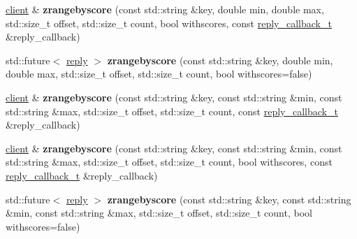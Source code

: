 \begin{DoxyCompactItemize}
\item 
\mbox{\label{classcpp__redis_1_1client_a4f5e81543f8138f897c10fbe17e56804}} 
\hyperlink{classcpp__redis_1_1client}{client} \& {\bfseries zrangebyscore} (const std\+::string \&key, double min, double max, std\+::size\+\_\+t offset, std\+::size\+\_\+t count, bool withscores, const \hyperlink{classcpp__redis_1_1client_a061a1140d36d2eaeda82b09a0bb3f9f2}{reply\+\_\+callback\+\_\+t} \&reply\+\_\+callback)
\item 
\mbox{\label{classcpp__redis_1_1client_af9d54a3c81954e838e31d1c2dd84bf39}} 
std\+::future$<$ \hyperlink{classcpp__redis_1_1reply}{reply} $>$ {\bfseries zrangebyscore} (const std\+::string \&key, double min, double max, std\+::size\+\_\+t offset, std\+::size\+\_\+t count, bool withscores=false)
\item 
\mbox{\label{classcpp__redis_1_1client_adfcaa1035607cde9679783d0b9f4c72b}} 
\hyperlink{classcpp__redis_1_1client}{client} \& {\bfseries zrangebyscore} (const std\+::string \&key, const std\+::string \&min, const std\+::string \&max, std\+::size\+\_\+t offset, std\+::size\+\_\+t count, const \hyperlink{classcpp__redis_1_1client_a061a1140d36d2eaeda82b09a0bb3f9f2}{reply\+\_\+callback\+\_\+t} \&reply\+\_\+callback)
\item 
\mbox{\label{classcpp__redis_1_1client_abbe9cc5870e5a0bd692ac08f36beea91}} 
\hyperlink{classcpp__redis_1_1client}{client} \& {\bfseries zrangebyscore} (const std\+::string \&key, const std\+::string \&min, const std\+::string \&max, std\+::size\+\_\+t offset, std\+::size\+\_\+t count, bool withscores, const \hyperlink{classcpp__redis_1_1client_a061a1140d36d2eaeda82b09a0bb3f9f2}{reply\+\_\+callback\+\_\+t} \&reply\+\_\+callback)
\item 
\mbox{\label{classcpp__redis_1_1client_afe3464407fae46d932cf8a527be1b4ab}} 
std\+::future$<$ \hyperlink{classcpp__redis_1_1reply}{reply} $>$ {\bfseries zrangebyscore} (const std\+::string \&key, const std\+::string \&min, const std\+::string \&max, std\+::size\+\_\+t offset, std\+::size\+\_\+t count, bool withscores=false)
\item 
\mbox{\label{classcpp__redis_1_1client_a5563d5240de4bbdbf6ed5dd8cc92a67a}} 

\end{DoxyCompactItemize}
